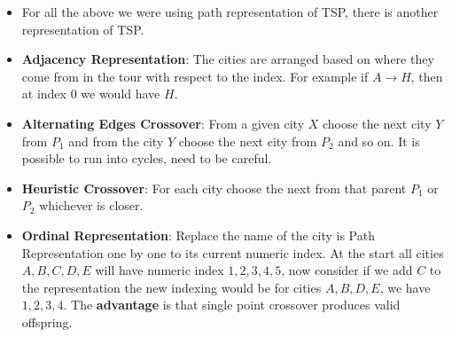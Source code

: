 \documentclass[a4paper]{article}
\begin{document}
\begin{itemize}
    \item For all the above we were using path representation of TSP, there is another representation of TSP.
    \item \textbf{Adjacency Representation}: The cities are arranged based on where they come from in the tour with respect to the index. For example if $A\rightarrow H$, then at index 0 we would have $H$.
    \item \textbf{Alternating Edges Crossover}: From a given city $X$ choose the next city $Y$ from $P_1$ and from the city $Y$ choose the next city from $P_2$ and so on. It is possible to run into cycles, need to be careful.
    \item \textbf{Heuristic Crossover}: For each city choose the next from that parent $P_1$ or $P_2$ whichever is closer.
    \item \textbf{Ordinal Representation}: Replace the name of the city is Path Representation one by one to its current numeric index. At the start all cities $A,B,C,D,E$ will have numeric index $1,2,3,4,5$, now consider if we add $C$ to the representation the new indexing would be for cities $A,B,D,E$, we have $1,2,3,4$. The \textbf{advantage} is that single point crossover produces valid offspring.
\end{itemize}
\end{document}
